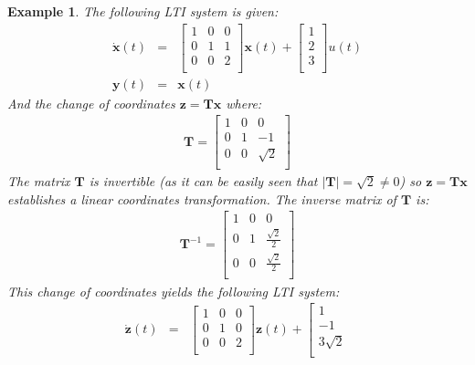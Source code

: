 \documentclass[a4paper,10pt,oneside]{book}
\newtheorem{example}{Example}
\begin{document}
\begin{example}
The following LTI system is given:
\begin{eqnarray}
\dot{\mathbf{x}}(t)&=&\left[ {\begin{array}{ccc}
 1 & 0 & 0  \\
 0 & 1 & 1  \\
 0 & 0 & 2 \\
 \end{array} } \right]
\mathbf{x}(t)+ 
\left[ {\begin{array}{c}
 1 \\ 2 \\ 3 \\
 \end{array} } \right]
u(t)\\
\mathbf{y}(t)&=&\mathbf{x}(t)
\end{eqnarray} 
And the change of coordinates $\mathbf{z}=\mathbf{Tx}$ where:
\begin{eqnarray}
\mathbf{T}=\left[ {\begin{array}{ccc}
 1 & 0 & 0  \\
 0 & 1 & -1  \\
 0 & 0 & \sqrt{2} \\
 \end{array} } \right]
\end{eqnarray} 
The matrix $\mathbf{T}$ is invertible (as it can be easily seen that $|\mathbf{T}|=\sqrt{2}\neq0$) so $\mathbf{z}=\mathbf{Tx}$ establishes a linear coordinates transformation. The inverse matrix of $\mathbf{T}$ is:
\begin{eqnarray}
\mathbf{T}^{-1}=\left[ {\begin{array}{ccc}
 1 & 0 & 0  \\
 0 & 1 & \frac{\sqrt{2}}{2}  \\
 0 & 0 & \frac{\sqrt{2}}{2} \\
 \end{array} } \right]
\end{eqnarray} 
This change of coordinates yields the following LTI system:
\begin{eqnarray}
\dot{\mathbf{z}}(t)&=&\left[ {\begin{array}{ccc}
 1 & 0 & 0  \\
 0 & 1 & 0  \\
 0 & 0 & 2 \\
 \end{array} } \right]
\mathbf{z}(t)+ 
\left[ {\begin{array}{c}
 1 \\ -1 \\ 3\sqrt{2} \\

\end{array}}
\end{eqnarray}
\end{example}
\end{document}
